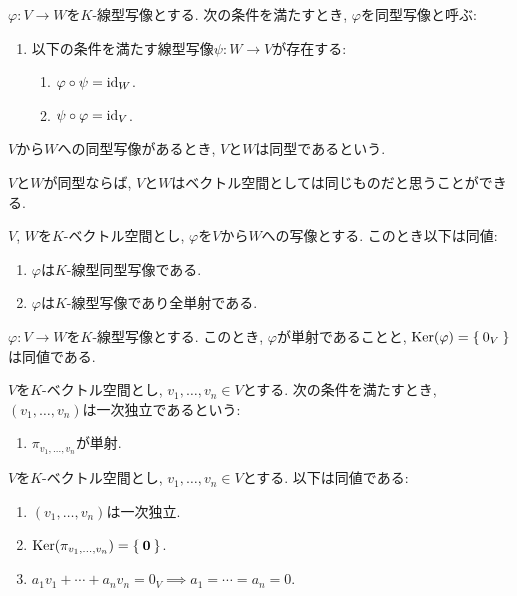 \begin{definition}
  $\varphi\colon V\to W$を$K$-線型写像とする.
  次の条件を満たすとき, $\varphi$を同型写像と呼ぶ:
  \begin{enumerate}
  \item 以下の条件を満たす線型写像$\psi\colon W\to V$が存在する:
    \begin{enumerate}
      \item $\varphi\circ \psi=\operatorname{id}_W$.
      \item $\psi\circ \varphi=\operatorname{id}_V$.
    \end{enumerate}
  \end{enumerate}
  $V$から$W$への同型写像があるとき,
  $V$と$W$は同型であるという.
\end{definition}

\begin{remark}
  $V$と$W$が同型ならば,
  $V$と$W$はベクトル空間としては同じものだと思うことができる.
\end{remark}
\begin{prop}
  $V$, $W$を$K$-ベクトル空間とし,
  $\varphi$を$V$から$W$への写像とする.
  このとき以下は同値:
  \begin{enumerate}
  \item $\varphi$は$K$-線型同型写像である.
  \item $\varphi$は$K$-線型写像であり全単射である.
  \end{enumerate}
\end{prop}
\begin{prop}
  $\varphi\colon V\to W$を$K$-線型写像とする.
  このとき, $\varphi$が単射であることと,
  $\operatorname{Ker}(\varphi)=\Set{0_V}$は同値である.
\end{prop}
\begin{definition}
  $V$を$K$-ベクトル空間とし,
  $v_1,\ldots,v_n\in V$とする.
  次の条件を満たすとき,
  $(v_1,\ldots,v_n)$は一次独立であるという:
  \begin{enumerate}
    \item $\pi_{v_1,\ldots,v_n}$が単射.
  \end{enumerate}
\end{definition}
\begin{remark}
  $V$を$K$-ベクトル空間とし,
  $v_1,\ldots,v_n\in V$とする.
  以下は同値である:
  \begin{enumerate}
  \item $(v_1,\ldots,v_n)$は一次独立.
  \item $\operatorname{Ker}(\pi_{v_1,\ldots,v_n})=\Set{\boldsymbol{0}}$.
  \item $a_1v_1+\cdots+a_nv_n=0_V\implies a_1=\cdots=a_n=0$.
  \end{enumerate}
\end{remark}
